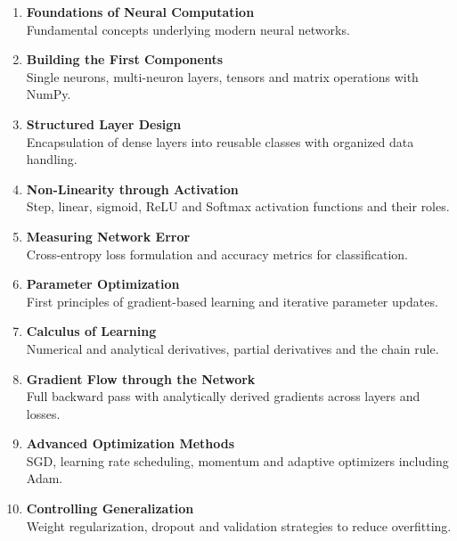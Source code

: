 \documentclass[12pt,a4paper]{report}
\begin{document}
\begin{enumerate}[
    leftmargin=0pt,
    itemindent=1.5em,
    label=\textbf{\arabic*.},
    itemsep=0.75em,
    topsep=0.3em,
    parsep=0pt
]

\item \textbf{Foundations of Neural Computation}\\
Fundamental concepts underlying modern neural networks.

\item \textbf{Building the First Components}\\
Single neurons, multi-neuron layers, tensors and matrix operations with NumPy.

\item \textbf{Structured Layer Design}\\
Encapsulation of dense layers into reusable classes with organized data handling.

\item \textbf{Non-Linearity through Activation}\\
Step, linear, sigmoid, ReLU and Softmax activation functions and their roles.

\item \textbf{Measuring Network Error}\\
Cross-entropy loss formulation and accuracy metrics for classification.

\item \textbf{Parameter Optimization}\\
First principles of gradient-based learning and iterative parameter updates.

\item \textbf{Calculus of Learning}\\
Numerical and analytical derivatives, partial derivatives and the chain rule.

\item \textbf{Gradient Flow through the Network}\\
Full backward pass with analytically derived gradients across layers and losses.

\item \textbf{Advanced Optimization Methods}\\
SGD, learning rate scheduling, momentum and adaptive optimizers including Adam.

\item \textbf{Controlling Generalization}\\
Weight regularization, dropout and validation strategies to reduce overfitting.


\end{enumerate}
\end{document}
